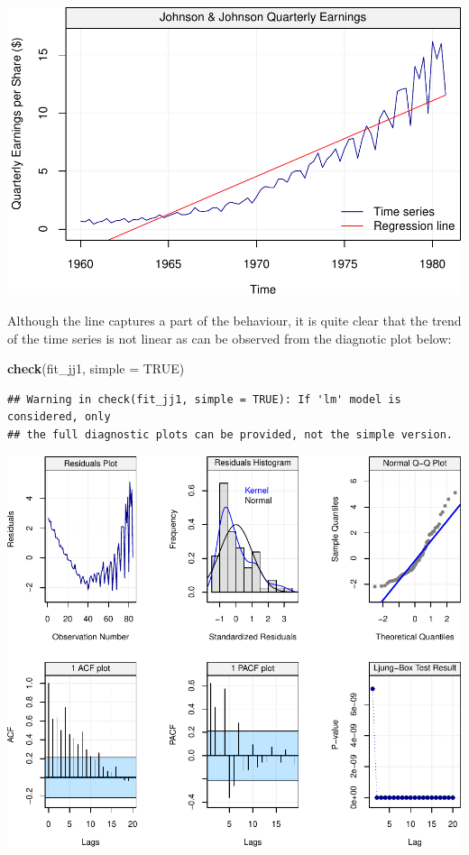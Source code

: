 \documentclass[]{book}
\newenvironment{Shaded}{\begin{snugshade}}{\end{snugshade}}
\newcommand{\DataTypeTok}[1]{\textcolor[rgb]{0.13,0.29,0.53}{#1}}
\newcommand{\KeywordTok}[1]{\textcolor[rgb]{0.13,0.29,0.53}{\textbf{#1}}}
\newcommand{\NormalTok}[1]{#1}
\newcommand{\OtherTok}[1]{\textcolor[rgb]{0.56,0.35,0.01}{#1}}
\theoremstyle{definition}
\theoremstyle{definition}
\theoremstyle{definition}
\theoremstyle{remark}
\begin{document}
\begin{center}\includegraphics{ts_files/figure-latex/jjexample2-1} \end{center}

Although the line captures a part of the behaviour, it is quite clear
that the trend of the time series is not linear as can be observed from
the diagnotic plot below:

\begin{Shaded}
\begin{Highlighting}[]
\KeywordTok{check}\NormalTok{(fit_jj1, }\DataTypeTok{simple =} \OtherTok{TRUE}\NormalTok{)}
\end{Highlighting}
\end{Shaded}

\begin{verbatim}
## Warning in check(fit_jj1, simple = TRUE): If 'lm' model is considered, only
## the full diagnostic plots can be provided, not the simple version.
\end{verbatim}

\begin{center}\includegraphics{ts_files/figure-latex/lmresid-1} \end{center}
\end{document}
